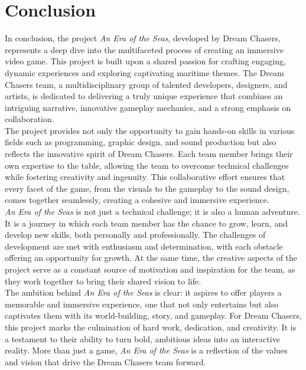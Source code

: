 \documentclass{article}
\begin{document}
\newpage
\section{Conclusion}\hfill

In conclusion, the project \textit{An Era of the Seas}, developed by Dream Chasers, represents a deep dive into the multifaceted process of creating an immersive video game. This project is built upon a shared passion for crafting engaging, dynamic experiences and exploring captivating maritime themes. The Dream Chasers team, a multidisciplinary group of talented developers, designers, and artists, is dedicated to delivering a truly unique experience that combines an intriguing narrative, innovative gameplay mechanics, and a strong emphasis on collaboration.\\

The project provides not only the opportunity to gain hands-on skills in various fields such as programming, graphic design, and sound production but also reflects the innovative spirit of Dream Chasers. Each team member brings their own expertise to the table, allowing the team to overcome technical challenges while fostering creativity and ingenuity. This collaborative effort ensures that every facet of the game, from the visuals to the gameplay to the sound design, comes together seamlessly, creating a cohesive and immersive experience.\\

\textit{An Era of the Seas} is not just a technical challenge; it is also a human adventure. It is a journey in which each team member has the chance to grow, learn, and develop new skills, both personally and professionally. The challenges of development are met with enthusiasm and determination, with each obstacle offering an opportunity for growth. At the same time, the creative aspects of the project serve as a constant source of motivation and inspiration for the team, as they work together to bring their shared vision to life.\\

The ambition behind \textit{An Era of the Seas} is clear: it aspires to offer players a memorable and immersive experience, one that not only entertains but also captivates them with its world-building, story, and gameplay. For Dream Chasers, this project marks the culmination of hard work, dedication, and creativity. It is a testament to their ability to turn bold, ambitious ideas into an interactive reality. More than just a game, \textit{An Era of the Seas} is a reflection of the values and vision that drive the Dream Chasers team forward.\\
\end{document}
